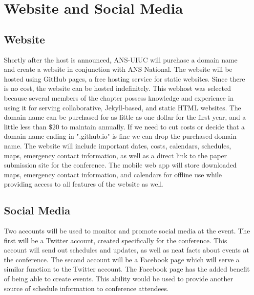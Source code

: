 \section{Website and Social Media}
\subsection{Website}
Shortly after the host is announced, ANS-UIUC will purchase a domain name and create a website in conjunction with ANS National. The website will be hosted using GitHub pages, a free hosting service for static websites. Since there is no cost, the website can be hosted indefinitely. This webhost was selected because several members of the chapter possess knowledge and experience in using it for serving collaborative, Jekyll-based, and static HTML websites. The domain name can be purchased for as little as one dollar for the first year, and a little less than $\$20$ to maintain annually. If we need to cut costs or decide that a domain name ending in ".github.io" is fine we can drop the purchased domain name. The website will include important dates, costs, calendars, schedules, maps, emergency contact information, as well as a direct link to the paper submission site for the conference. The mobile web app will store downloaded maps, emergency contact information, and calendars for offline use while providing access to all features of the website as well.

\subsection{Social Media} 
Two accounts will be used to monitor and promote social media at the event. The first will be a Twitter account, created specifically for the conference. This account will send out schedules and updates, as well as neat facts about events at the conference. The second account will be a Facebook page which will serve a similar function to the Twitter account. The Facebook page has the added benefit of being able to create events. This ability would be used to provide another source of schedule information to conference attendees. 